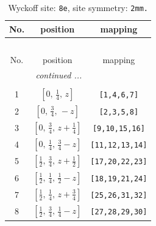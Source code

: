 \documentclass[fleqn,8pt]{jsarticle}
\begin{document}
\begin{longtable}{ccc}
\caption{Wyckoff site: {\tt 8e}, site symmetry: {\tt 2mm.}}
 \\
 \hline \hline
No. & position & mapping \\ \hline \endfirsthead

\multicolumn{2}{l}{\tablename\ \thetable{}} \\
 \hline \hline
No. & position & mapping \\ \hline \endhead

 \hline \hline
\multicolumn{2}{r}{\footnotesize\it continued ...} \\ \endfoot

 \hline \hline
\multicolumn{2}{r}{} \\ \endlastfoot

1 & $\left[ 0,\, \frac{1}{4},\, z \right]$ & {\tt [1,4,6,7]} \\ \hline
2 & $\left[ 0,\, \frac{3}{4},\, - z \right]$ & {\tt [2,3,5,8]} \\ \hline
3 & $\left[ 0,\, \frac{3}{4},\, z + \frac{1}{4} \right]$ & {\tt [9,10,15,16]} \\ \hline
4 & $\left[ 0,\, \frac{1}{4},\, \frac{3}{4} - z \right]$ & {\tt [11,12,13,14]} \\ \hline
5 & $\left[ \frac{1}{2},\, \frac{3}{4},\, z + \frac{1}{2} \right]$ & {\tt [17,20,22,23]} \\ \hline
6 & $\left[ \frac{1}{2},\, \frac{1}{4},\, \frac{1}{2} - z \right]$ & {\tt [18,19,21,24]} \\ \hline
7 & $\left[ \frac{1}{2},\, \frac{1}{4},\, z + \frac{3}{4} \right]$ & {\tt [25,26,31,32]} \\ \hline
8 & $\left[ \frac{1}{2},\, \frac{3}{4},\, \frac{1}{4} - z \right]$ & {\tt [27,28,29,30]} \\
\end{longtable}
\renewcommand{\arraystretch}{1.2}
\end{document}

